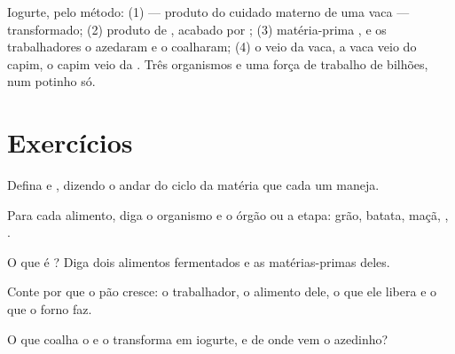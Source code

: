 \begin{example}\label{ex:g6:producing-our-food:breakfast}
Iogurte, pelo método: (1)  --- produto do cuidado materno de uma
vaca --- transformado; (2) produto de , acabado por
; (3) matéria-prima , e os trabalhadores o azedaram e o
coalharam; (4) o  veio da vaca, a vaca veio do capim, o capim
veio da . Três organismos e uma força de trabalho de bilhões, num
potinho só.
\end{example}

\section{Exercícios}

\begin{exercise}[$\star$]\label{exo:g6:producing-our-food:1}
Defina  e , dizendo o andar do ciclo da
matéria que cada um maneja.
\end{exercise}

\begin{exercise}[$\star$]\label{exo:g6:producing-our-food:2}
Para cada alimento, diga o organismo e o órgão ou a etapa: grão,
batata, maçã, , .
\end{exercise}

\begin{exercise}[$\star$]\label{exo:g6:producing-our-food:3}
O que é ? Diga dois alimentos fermentados e as
matérias-primas deles.
\end{exercise}

\begin{exercise}[$\star$]\label{exo:g6:producing-our-food:4}
Conte por que o pão cresce: o trabalhador, o alimento dele, o que ele
libera e o que o forno faz.
\end{exercise}

\begin{exercise}[$\star$]\label{exo:g6:producing-our-food:5}
O que coalha o  e o transforma em iogurte, e de onde vem o
azedinho?
\end{exercise}

